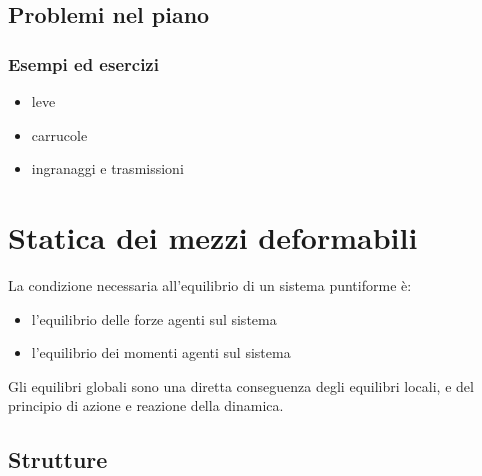 \documentclass[letterpaper,10pt,italian]{jupyterBook}
\begin{document}
\subsection{Problemi nel piano}
\label{\detokenize{ch/mechanics/statics-rigid:problemi-nel-piano}}

\subsubsection{Esempi ed esercizi}
\label{\detokenize{ch/mechanics/statics-rigid:esempi-ed-esercizi}}\begin{itemize}
\item {} 
\sphinxAtStartPar
leve

\item {} 
\sphinxAtStartPar
carrucole

\item {} 
\sphinxAtStartPar
ingranaggi e trasmissioni

\end{itemize}

\sphinxstepscope


\section{Statica dei mezzi deformabili}
\label{\detokenize{ch/mechanics/statics-fluid:statica-dei-mezzi-deformabili}}\label{\detokenize{ch/mechanics/statics-fluid:physics-hs-mechanics-statics-fluid}}\label{\detokenize{ch/mechanics/statics-fluid::doc}}
\sphinxAtStartPar
La condizione necessaria all’equilibrio di un sistema puntiforme è:
\begin{itemize}
\item {} 
\sphinxAtStartPar
l’equilibrio  delle forze agenti sul sistema

\item {} 
\sphinxAtStartPar
l’equilibrio  dei momenti agenti sul sistema

\end{itemize}

\sphinxAtStartPar
Gli equilibri globali sono una diretta conseguenza degli equilibri locali, e del principio di azione e reazione della dinamica.


\subsection{Strutture}
\label{\detokenize{ch/mechanics/statics-fluid:strutture}}
\end{document}
